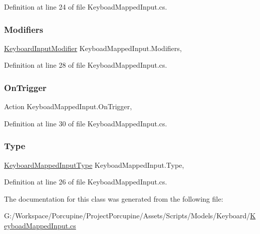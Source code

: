Definition at line 24 of file Keyboad\+Mapped\+Input.\+cs.

\mbox{\label{class_keyboad_mapped_input_a0f57bcd82b58feb7150568e8da9cc202}} 
\subsubsection{\texorpdfstring{Modifiers}{Modifiers}}
{\footnotesize\ttfamily \hyperlink{_keyboard_input_modifier_8cs_a45c5fbd3fc0bd2cbe0f27f511d6b5955}{Keyboard\+Input\+Modifier} Keyboad\+Mapped\+Input.\+Modifiers\hspace{0.3cm}{\ttfamily [get]}, {\ttfamily [set]}}



Definition at line 28 of file Keyboad\+Mapped\+Input.\+cs.

\mbox{\label{class_keyboad_mapped_input_add1680f7a6942ded6a8838b18568e99c}} 
\subsubsection{\texorpdfstring{On\+Trigger}{OnTrigger}}
{\footnotesize\ttfamily Action Keyboad\+Mapped\+Input.\+On\+Trigger\hspace{0.3cm}{\ttfamily [get]}, {\ttfamily [set]}}



Definition at line 30 of file Keyboad\+Mapped\+Input.\+cs.

\mbox{\label{class_keyboad_mapped_input_aa47b55c92f30bb6d2b2715ac59a9872a}} 
\subsubsection{\texorpdfstring{Type}{Type}}
{\footnotesize\ttfamily \hyperlink{_keyboard_mapped_input_type_8cs_ae342fcbcca71b2c821363b14ed799463}{Keyboard\+Mapped\+Input\+Type} Keyboad\+Mapped\+Input.\+Type\hspace{0.3cm}{\ttfamily [get]}, {\ttfamily [set]}}



Definition at line 26 of file Keyboad\+Mapped\+Input.\+cs.



The documentation for this class was generated from the following file\+:\begin{DoxyCompactItemize}
\item 
G\+:/\+Workspace/\+Porcupine/\+Project\+Porcupine/\+Assets/\+Scripts/\+Models/\+Keyboard/\hyperlink{_keyboad_mapped_input_8cs}{Keyboad\+Mapped\+Input.\+cs}\end{DoxyCompactItemize}
